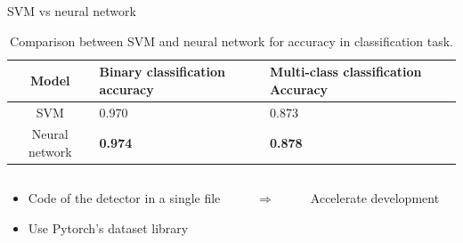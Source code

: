 \documentclass[11pt,compress]{beamer} %
\begin{document}
\begin{frame}{SVM vs neural network}
  \begin{table}[H]
    \centering
    \begin{tabular}{|c|p{}|p{}|}
        \hline
        Model & Binary classification accuracy & Multi-class classification Accuracy\\
        \hline
        SVM & 0.970 & 0.873\\
        \hline
        Neural network & \textbf{0.974} & \textbf{0.878}\\
        \hline
    \end{tabular}
    \caption{Comparison between SVM and neural network for accuracy in classification task.}
    \label{table:svmVsNN}
  \end{table}
  
  \pause
  \begin{columns}
    \begin{column}{.4\textwidth}
      \begin{itemize}
        \item Code of the detector in a single file
        \pause
        \item Use Pytorch's dataset library
      \end{itemize}
    \end{column}
    \pause
    \begin{column}{.05\textwidth}
      \Huge
      $\Rightarrow$
    \end{column}

    \begin{column}{.4\textwidth}
      Accelerate development
    \end{column}
  \end{columns}
\end{frame}
\end{document}
